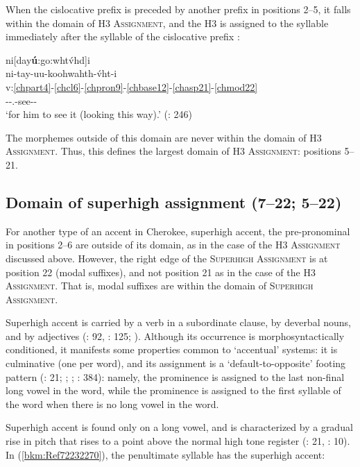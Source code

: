 \documentclass[output=paper]{langscibook}
\begin{document}
When the cislocative prefix is preceded by another prefix in positions 2--5, it falls within the domain of H3 \textsc{Assignment}, and the H3 is assigned to the syllable immediately after the syllable of the cislocative prefix \citep[204]{uchihara2016tone}: 

\ea\label{ex:cher:key:23} {ni[day\textbf{ú}:go:whtv́hd]i} \\
\glll ni-tay-uu-koohwahth-v́ht-i\\
 v:\ref{chpart4}-\ref{chcl6}-\ref{chpron9}-\ref{chbase12}-\ref{chasp21}-\ref{chmod22} \\
\Part{}-\Cisl{}-\Third\Sg.\Barg{}-see-\Inf{}-\Nom{}\\ 
\glt `for him to see it (looking this way).' (\citealt{PulteFeeling1975}: 246)
\z 

The morphemes outside of this domain are never within the domain of H3 \textsc{Assignment}. Thus, this defines the largest domain of H3 \textsc{Assignment}: positions {5--21}.  


\subsection{Domain of superhigh assignment (7--22; 5--22)}
\label{bkm:Ref72236002}
For another type of an accent in Cherokee, superhigh accent, the pre-pronominal in positions  2–6  are outside of its domain, as in the case of the H3 \textsc{Assignment} discussed above. However, the right edge of the \textsc{Superhigh} \textsc{Assignment} is at position 22 (modal suffixes), and not position  21 as in the case of the H3 \textsc{Assignment}. That is, modal suffixes are within the domain of \textsc{Superhigh} \textsc{Assignment}.

Superhigh accent is carried by a verb in a subordinate clause, by deverbal nouns, and by adjectives (\citealt{Cook1979}: 92, \citealt{Lindsey1985}: 125; \citealt[Ch 11.2]{uchihara2016tone}). Although its occurrence is morphosyntactically conditioned, it manifests some properties common to `accentual' systems: it is culminative (one per word), and its assignment is a `default-to-opposite' footing pattern (\citealt{Wright1996}: 21; \citealt[296--299]{Hayes1995}; \citealt{Kager2012}; \citealt{Kager1995}: 384): namely, the prominence is assigned to the last non-final long vowel in the word, while the prominence is assigned to the first syllable of the word when there is no long vowel in the word. 

Superhigh accent is found only on a long vowel, and is characterized by a gradual rise in pitch that rises to a point above the normal high tone register (\citealt{Wright1996}: 21, \citealt{Johnson2005}: 10). In (\ref{bkm:Ref72232270}), the penultimate syllable has the superhigh accent:
\end{document}
